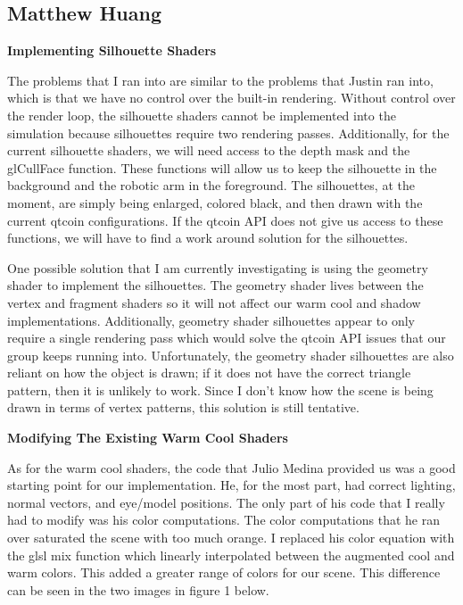 \documentclass[10pt,journal,compsoc,draftclsnofoot]{IEEEtran}
\begin{document}
\begin{flushleft}
\subsection{Matthew Huang}
\textbf{Implementing Silhouette Shaders}
\par
The problems that I ran into are similar to the problems that Justin ran into, which is that we have no control over the built-in rendering.
Without control over the render loop, the silhouette shaders cannot be implemented into the simulation because silhouettes require two rendering passes.
Additionally, for the current silhouette shaders, we will need access to the depth mask and the glCullFace function.
These functions will allow us to keep the silhouette in the background and the robotic arm in the foreground.
The silhouettes, at the moment, are simply being enlarged, colored black, and then drawn with the current qtcoin configurations.
If the qtcoin API does not give us access to these functions, we will have to find a work around solution for the silhouettes.
\par
One possible solution that I am currently investigating is using the geometry shader to implement the silhouettes.
The geometry shader lives between the vertex and fragment shaders so it will not affect our warm cool and shadow implementations.
Additionally, geometry shader silhouettes appear to only require a single rendering pass which would solve the qtcoin API issues that our group keeps running into.
Unfortunately, the geometry shader silhouettes are also reliant on how the object is drawn; if it does not have the correct triangle pattern, then it is unlikely to work.
Since I don't know how the scene is being drawn in terms of vertex patterns, this solution is still tentative.

\vspace{3mm}

\textbf{Modifying The Existing Warm Cool Shaders}
\par
As for the warm cool shaders, the code that Julio Medina provided us was a good starting point for our implementation.
He, for the most part, had correct lighting, normal vectors, and eye/model positions.
The only part of his code that I really had to modify was his color computations.
The color computations that he ran over saturated the scene with too much orange.
I replaced his color equation with the glsl mix function which linearly interpolated between the augmented cool and warm colors.
This added a greater range of colors for our scene.
This difference can be seen in the two images in figure 1 below.


\end{flushleft}
\end{document}

